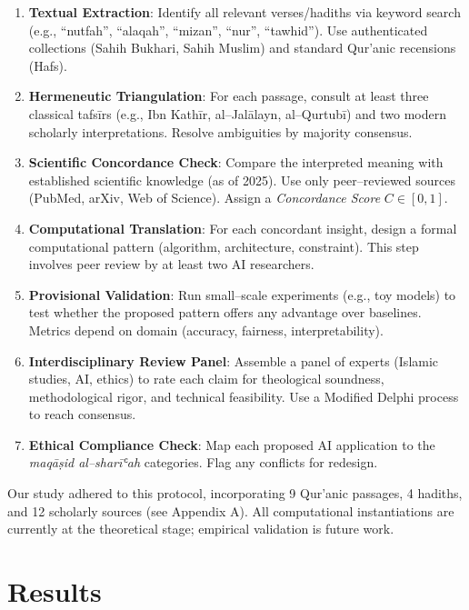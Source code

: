 \documentclass[12pt,twocolumn]{article}
\begin{document}
\begin{enumerate}[label=\textbf{Step \arabic*.}]
\item \textbf{Textual Extraction}: Identify all relevant verses/hadiths via keyword search (e.g., ``nutfah'', ``alaqah'', ``mizan'', ``nur'', ``tawhid''). Use authenticated collections (Sahih Bukhari, Sahih Muslim) and standard Qur'anic recensions (Hafs).
\item \textbf{Hermeneutic Triangulation}: For each passage, consult at least three classical tafsīrs (e.g., Ibn Kathīr, al--Jalālayn, al--Qurtubī) and two modern scholarly interpretations. Resolve ambiguities by majority consensus.
\item \textbf{Scientific Concordance Check}: Compare the interpreted meaning with established scientific knowledge (as of 2025). Use only peer--reviewed sources (PubMed, arXiv, Web of Science). Assign a \emph{Concordance Score} $C \in [0,1]$.
\item \textbf{Computational Translation}: For each concordant insight, design a formal computational pattern (algorithm, architecture, constraint). This step involves peer review by at least two AI researchers.
\item \textbf{Provisional Validation}: Run small--scale experiments (e.g., toy models) to test whether the proposed pattern offers any advantage over baselines. Metrics depend on domain (accuracy, fairness, interpretability).
\item \textbf{Interdisciplinary Review Panel}: Assemble a panel of experts (Islamic studies, AI, ethics) to rate each claim for theological soundness, methodological rigor, and technical feasibility. Use a Modified Delphi process to reach consensus.
\item \textbf{Ethical Compliance Check}: Map each proposed AI application to the \emph{maqāṣid al--sharīʿah} categories. Flag any conflicts for redesign.
\end{enumerate}

Our study adhered to this protocol, incorporating 9 Qur'anic passages, 4 hadiths, and 12 scholarly sources (see Appendix A). All computational instantiations are currently at the theoretical stage; empirical validation is future work.

\section{Results}
\end{document}

